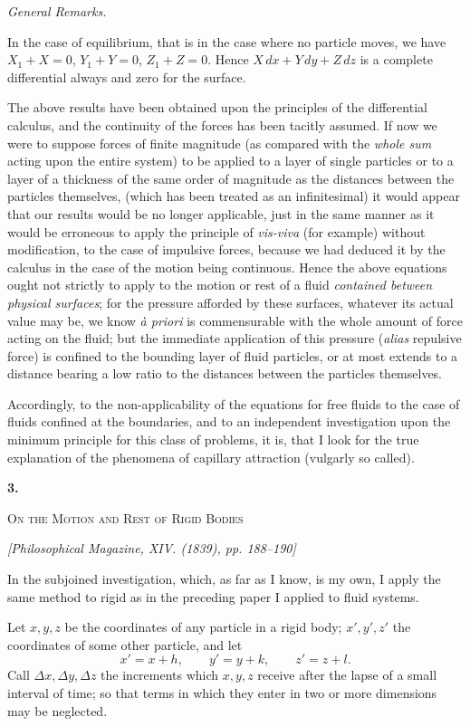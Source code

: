 \documentclass[11pt]{article}
\newcommand{\paperhead}[3]{%
  \clearpage
  \begin{center}
  {\Large\bfseries #1.}\par\vspace{0.85em}
  {\large\scshape #2}\par\vspace{0.6em}
  {\itshape [#3]}\par
  \end{center}\vspace{0.4em}}
\newcommand{\sourcepage}[1]{\marginpar{\scriptsize p.~#1}}
\begin{document}
\begin{center}\itshape General Remarks.\end{center}

In the case of equilibrium, that is in the case where no particle moves, we have $X_1+X=0$, $Y_1+Y=0$, $Z_1+Z=0$. Hence $X\,dx+Y\,dy+Z\,dz$ is a complete differential always and zero for the surface.

The above results have been obtained upon the principles of the differential calculus, and the continuity of the forces has been tacitly assumed. If now we were to suppose forces of finite magnitude (as compared with the \emph{whole sum} acting upon the entire system) to be applied to a layer of single particles or to a layer of a thickness of the same order of magnitude as the distances between the particles themselves, (which has been treated as an infinitesimal) it would appear that our results would be no longer applicable, just in the same manner as it would be erroneous to apply the principle of \emph{vis-viva} (for example) without modification, to the case of impulsive forces, because we had deduced it by the calculus in the case of the motion being continuous. Hence the above equations ought not strictly to apply to the motion or rest of a fluid \emph{contained between physical surfaces}; for the pressure afforded by these surfaces, whatever its actual value may be, we know \emph{à priori} is commensurable with the whole amount of force acting on the fluid; but the immediate application of this pressure (\emph{alias} repulsive force) is confined to the bounding layer of fluid particles, or at most extends to a distance bearing a low ratio to the distances between the particles themselves.

Accordingly, to the non-applicability of the equations for free fluids to the case of fluids confined at the boundaries, and to an independent investigation upon the minimum principle for this class of problems, it is, that I look for the true explanation of the phenomena of capillary attraction (vulgarly so called).

\paperhead{3}{On the Motion and Rest of Rigid Bodies}{Philosophical Magazine, XIV. (1839), pp. 188--190}
\sourcepage{33}
In the subjoined investigation, which, as far as I know, is my own, I apply the same method to rigid as in the preceding paper I applied to fluid systems.

Let $x,y,z$ be the coordinates of any particle in a rigid body; $x',y',z'$ the coordinates of some other particle, and let
\[
x'=x+h,\qquad y'=y+k,\qquad z'=z+l.
\]
Call $\Delta x,\Delta y,\Delta z$ the increments which $x,y,z$ receive after the lapse of a small interval of time; so that terms in which they enter in two or more dimensions may be neglected.
\end{document}
